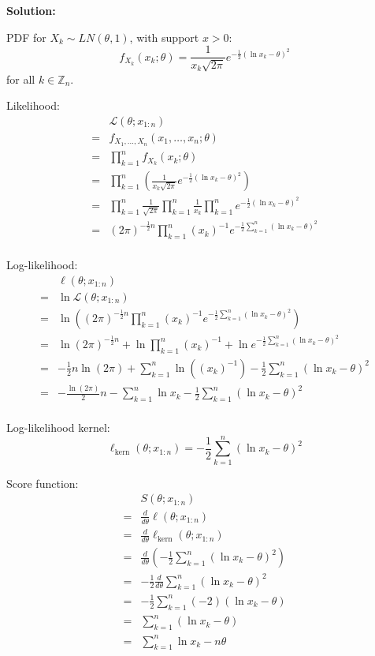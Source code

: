 \documentclass{article}
\begin{document}
\textbf{Solution:}
\begin{ssolution}
PDF for \(X_k \sim LN(\theta,1)\), with support \(x>0\):
\[f_{X_k}(x_k;\theta) = \frac{1}{x_k\sqrt{2\pi}}e^{-\frac{1}{2}(\ln{x_k}-\theta)^2}\]
for all \(k\in \mathbb{Z}_n\).

Likelihood:
\begin{align*}
	& \mathcal{L}(\theta;x_{1:n}) \\
	=& f_{X_1,\ldots,X_n}(x_1,\ldots,x_n;\theta) \\
	=& \prod_{k=1}^nf_{X_k}(x_k;\theta) \\
	=& \prod_{k=1}^n\left(\frac{1}{x_k\sqrt{2\pi}}e^{-\frac{1}{2}(\ln{x_k}-\theta)^2}\right) \\
	=& \prod_{k=1}^n \frac{1}{\sqrt{2\pi}}\prod_{k=1}^n\frac{1}{x_k} \prod_{k=1}^n e^{-\frac{1}{2}(\ln{x_k}-\theta)^2} \\
	=& (2\pi)^{-\frac12 n}\prod_{k=1}^n(x_k)^{-1} e^{-\frac{1}{2}\sum_{k=1}^n(\ln{x_k}-\theta)^2} \\
\end{align*}

Log-likelihood:
\begin{align*}
	& \ell(\theta;x_{1:n}) \\
	=& \ln \mathcal{L}(\theta;x_{1:n}) \\
	=& \ln \left( (2\pi)^{-\frac12 n}\prod_{k=1}^n(x_k)^{-1} e^{-\frac{1}{2}\sum_{k=1}^n(\ln{x_k}-\theta)^2} \right) \\
	=& \ln (2\pi)^{-\frac12 n} + \ln \prod_{k=1}^n(x_k)^{-1} + \ln e^{-\frac{1}{2}\sum_{k=1}^n(\ln{x_k}-\theta)^2} \\
	=& -\frac{1}{2}n\ln (2\pi) + \sum_{k=1}^n\ln ((x_k)^{-1}) -\frac{1}{2}\sum_{k=1}^n(\ln{x_k}-\theta)^2 \\
	=& -\frac{\ln(2\pi)}{2}n - \sum_{k=1}^n\ln x_k -\frac{1}{2}\sum_{k=1}^n(\ln{x_k}-\theta)^2 \\
\end{align*}

Log-likelihood kernel:
\[\ell_{\text{kern}}(\theta;x_{1:n}) = -\frac{1}{2}\sum_{k=1}^n(\ln{x_k}-\theta)^2 \]

Score function:
\begin{align*}
	& S(\theta;x_{1:n}) \\
	=& \frac{d}{d\theta}\ell(\theta;x_{1:n}) \\
	=& \frac{d}{d\theta}\ell_{\text{kern}}(\theta;x_{1:n}) \\
	=& \frac{d}{d\theta} \left(-\frac{1}{2}\sum_{k=1}^n(\ln{x_k}-\theta)^2\right) \\
	=& -\frac{1}{2}\frac{d}{d\theta} \sum_{k=1}^n(\ln{x_k}-\theta)^2 \\
	=& -\frac{1}{2}\sum_{k=1}^n(-2)(\ln{x_k}-\theta) \\
	=& \sum_{k=1}^n(\ln{x_k}-\theta) \\
	=& \sum_{k=1}^n\ln{x_k}-n\theta \\
\end{align*}


\end{ssolution}
\end{document}
